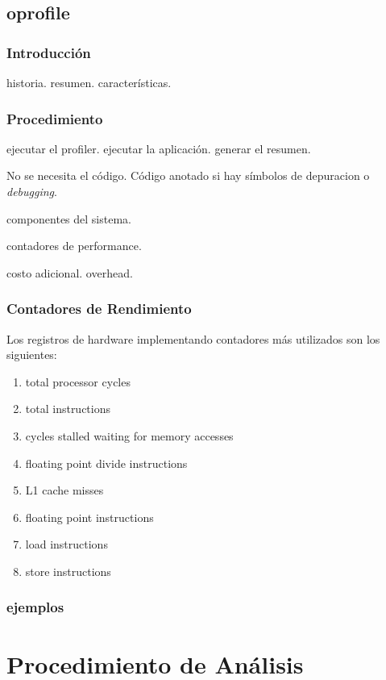 \documentclass[a4paper]{report}
\begin{document}
\section{oprofile}

\subsection{Introducci\'on}

historia. resumen. caracter\'isticas. 

\subsection{Procedimiento}

ejecutar el profiler. ejecutar la aplicaci\'on. generar el resumen.

No se necesita el c\'odigo. C\'odigo anotado si hay s\'imbolos de depuracion o
{\it debugging}.

componentes del sistema.

contadores de performance.

costo adicional. overhead.

\subsection{Contadores de Rendimiento}

Los registros de hardware implementando contadores m\'as utilizados son los
siguientes:

\begin{enumerate}
\item total processor cycles
\item total instructions
\item cycles stalled waiting for memory accesses
\item floating point divide instructions
\item L1 cache misses
\item floating point instructions
\item load instructions
\item store instructions
\end{enumerate}

\subsection{ejemplos}

\chapter{Procedimiento de An\'alisis}
\end{document}
